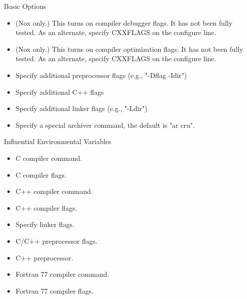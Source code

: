 \documentclass[12pt,strict]{TrilinosDevGuide}
\begin{document}
Basic Options

\begin{itemize}
\item {} 

(Nox only.)  This turns on compiler debugger flags. It has 
not been fully tested. As an alternate, specify CXXFLAGS on the 
                 configure line.

\item {}

(Nox only.)  This turns on compiler optimization flags. It 
has not been fully tested. As an alternate, specify CXXFLAGS on the 
                 configure line. 

\item {}

Specify additional preprocessor flags (e.g., "-Dflag -Idir") 

\item {}

Specify additional C++ flags 

\item {}

Specify additional linker flags (e.g., "-Ldir") 

\item {}

Specify a special archiver command, the default is "ar cru". 
\end{itemize}

 Influential Environmental Variables

\begin{itemize}
\item {}

C compiler command.

\item {}

C compiler flags.

\item {}

C++ compiler command.

\item {}

C++ compiler flags.

\item {}

Specify linker flags.

\item {}

C/C++ preprocessor flags.

\item {}

C++ preprocessor.

\item {}

Fortran 77 compiler command.

\item {}

Fortran 77 compiler flags.
\end{itemize}
\end{document}
